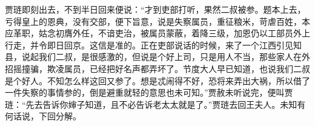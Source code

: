 \begin{parag}
    贾琏即刻出去，不到半日回来便说：“才到吏部打听，果然二叔被参。题本上去，亏得皇上的恩典，没有交部，便下旨意，说是失察属员，重征粮米，苛虐百姓，本应革职，姑念初膺外任，不谙吏治，被属员蒙蔽，着降三级，加恩仍以工部员外上行走，并令即日回京。这信是准的。正在吏部说话的时候，来了一个江西引见知县，说起我们二叔，是很感激的，但说是个好上司，只是用人不当，那些家人在外招摇撞骗，欺凌属员，已经把好名声都弄坏了。节度大人早已知道，也说我们二叔是个好人。不知怎么样这回又参了。想是忒闹得不好，恐将来弄出大祸，所以借了一件失察的事情参的，倒是避重就轻的意思也未可知。”贾赦未听说完，便叫贾琏：“先去告诉你婶子知道，且不必告诉老太太就是了。”贾琏去回王夫人。未知有何话说，下回分解。
\end{parag}
